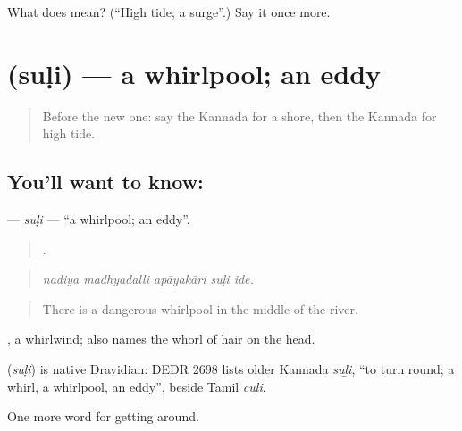 \begin{tcolorbox}[breakable,colback=teal!4,colframe=teal!35!black,title={Before you move on}]
What does  mean? (\textquotedblleft{}High tide; a surge\textquotedblright{}.) Say it once more.
\end{tcolorbox}
\section[\texorpdfstring{\kn{ಸುಳಿ} (suḷi)}{ಸುಳಿ (suḷi)}]{ (suḷi) — a whirlpool; an eddy}

\label{lesson:KA-C454-suli}



\begin{quote}
Before the new one: say the Kannada for a shore, then the Kannada for high tide.
\end{quote}

\subsection*{You'll want to know: }
\textbf{} — \emph{suḷi} — \textquotedblleft{}a whirlpool; an eddy\textquotedblright{}.

\begin{quote}
    .
\end{quote}

\begin{quote}
\emph{nadiya madhyadalli apāyakāri suḷi ide.}
\end{quote}

\begin{quote}
There is a dangerous whirlpool in the middle of the river.
\end{quote}

, a whirlwind;  also names the whorl of hair on the head.

\begin{cousinweb}
\textbf{} (\emph{suḷi}) is native Dravidian: DEDR 2698 lists older Kannada \emph{suḻi}, \textquotedblleft{}to turn round; a whirl, a whirlpool, an eddy\textquotedblright{}, beside Tamil \emph{cuḻi}.
\end{cousinweb}

\begin{grammarlens}[title={What you've built}]
One more word for getting around.
\end{grammarlens}

